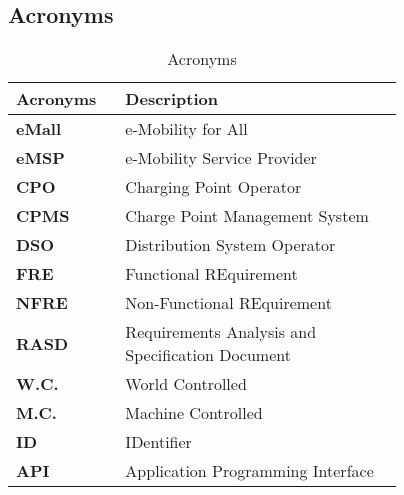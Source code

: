 \subsection{Acronyms} %
\label{subsec:acronyms}
\begin{table}[H]
\centering 
    \begin{tabular}{| p{0.175\linewidth} | p{0.6\linewidth} |}
    \hline
    \rowcolor{bluepoli!40}
     \textbf{Acronyms} & \textbf{Description} \T\B \\
    \hline \hline
    \textbf{eMall} & e-Mobility for All\T\B\\
    \hline
    \textbf{eMSP} & e-Mobility Service Provider\T\B\\
    \hline
    \textbf{CPO} & Charging Point Operator\T\B\\
    \hline
    \textbf{CPMS} & Charge Point Management System\T\B\\
    \hline
    \textbf{DSO} & Distribution System Operator\T\B\\
    \hline
    \textbf{FRE} & Functional REquirement\T\B\\
    \hline    
    \textbf{NFRE} & Non-Functional REquirement\T\B\\
    \hline
    \textbf{RASD} & Requirements Analysis and Specification Document\T\B\\
    \hline
    \textbf{W.C.} &  World Controlled\T\B\\
    \hline
    \textbf{M.C.} &  Machine Controlled\T\B\\
    \hline
    \textbf{ID} & IDentifier\T\B\\
    \hline
    \textbf{API} & Application Programming Interface\T\B\\
    \hline
    \end{tabular}
    \\[10pt]
    \caption{Acronyms}
\end{table}
